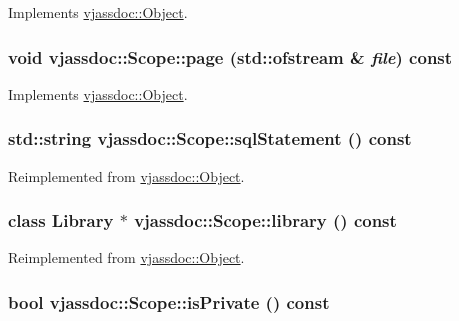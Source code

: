 Implements \hyperlink{classvjassdoc_1_1Object_736bbb6719edd8070d8f56c364a2764c}{vjassdoc::Object}.\hypertarget{classvjassdoc_1_1Scope_2a37c9d88da6a8c7c95d4f0e5b88ccbb}{
\subsubsection{\setlength{\rightskip}{0pt plus 5cm}void vjassdoc::Scope::page (std::ofstream \& {\em file}) const}}
\label{classvjassdoc_1_1Scope_2a37c9d88da6a8c7c95d4f0e5b88ccbb}




Implements \hyperlink{classvjassdoc_1_1Object_a0489e38956f3507566b1bc6e3e2c8af}{vjassdoc::Object}.\hypertarget{classvjassdoc_1_1Scope_634ae4bc06389b21ef8612795d4a910f}{
\subsubsection{\setlength{\rightskip}{0pt plus 5cm}std::string vjassdoc::Scope::sqlStatement () const}}
\label{classvjassdoc_1_1Scope_634ae4bc06389b21ef8612795d4a910f}




Reimplemented from \hyperlink{classvjassdoc_1_1Object_4e8ebbb0ce5b0bf91ec847b1e4a9f8fc}{vjassdoc::Object}.\hypertarget{classvjassdoc_1_1Scope_4d9d486897a1960cff057ab88a43fb15}{
\subsubsection{\setlength{\rightskip}{0pt plus 5cm}class {\bf Library} $\ast$ vjassdoc::Scope::library () const}}
\label{classvjassdoc_1_1Scope_4d9d486897a1960cff057ab88a43fb15}




Reimplemented from \hyperlink{classvjassdoc_1_1Object_cc4241505c5bcdd0bbcb08a1b665b3fd}{vjassdoc::Object}.\hypertarget{classvjassdoc_1_1Scope_c2b7a4d2f0a0e248194d9e96c3d00f10}{
\subsubsection{\setlength{\rightskip}{0pt plus 5cm}bool vjassdoc::Scope::isPrivate () const}}
\label{classvjassdoc_1_1Scope_c2b7a4d2f0a0e248194d9e96c3d00f10}


